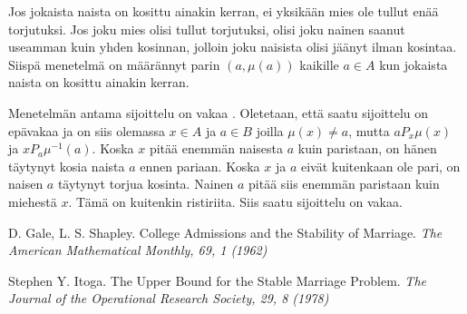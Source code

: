 \documentclass[gradu, twoside]{tktltiki}
\begin{document}
Jos jokaista naista on kosittu ainakin kerran, ei yksikään mies ole
tullut enää torjutuksi. Jos joku mies olisi tullut torjutuksi, olisi
joku nainen saanut useamman kuin yhden kosinnan, jolloin joku naisista
olisi jäänyt ilman kosintaa. Siispä menetelmä on määrännyt parin $(a,
\mu(a))$ kaikille $a \in A$ kun jokaista naista on kosittu ainakin
kerran.

Menetelmän antama sijoittelu on vakaa \cite{galeshapley62}. Oletetaan,
että saatu sijoittelu on epävakaa ja on siis olemassa $x \in A$ ja $a
\in B$ joilla $\mu(x) \neq a$, mutta $aP_x\mu(x)$ ja
$xP_a\mu^{-1}(a)$. Koska $x$ pitää enemmän naisesta $a$ kuin
paristaan, on hänen täytynyt kosia naista $a$ ennen pariaan. Koska $x$
ja $a$ eivät kuitenkaan ole pari, on naisen $a$ täytynyt torjua
kosinta. Nainen $a$ pitää siis enemmän paristaan kuin miehestä $x$.
Tämä on kuitenkin ristiriita. Siis saatu sijoittelu on vakaa.



\begin{thebibliography}{XXX99}

  D. Gale, L. S. Shapley.
  College Admissions and the Stability of Marriage.
  \emph{The American Mathematical Monthly, 69, 1 (1962)}

  Stephen Y. Itoga.
  The Upper Bound for the Stable Marriage Problem.
  \emph{The Journal of the Operational Research Society, 29, 8 (1978)}

\end{thebibliography}
\end{document}
